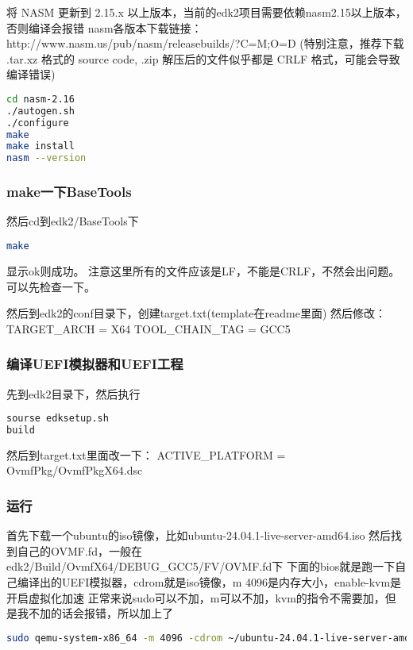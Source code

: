 将 NASM 更新到 2.15.x 以上版本，当前的edk2项目需要依赖nasm2.15以上版本，否则编译会报错
nasm各版本下载链接：http://www.nasm.us/pub/nasm/releasebuilds/?C=M;O=D
(特别注意，推荐下载 .tar.xz 格式的 source code, .zip 解压后的文件似乎都是 CRLF 格式，可能会导致编译错误)

\begin{lstlisting}[language=bash]
cd nasm-2.16
./autogen.sh
./configure
make
make install
nasm --version
\end{lstlisting}

\subsubsection{make一下BaseTools}

然后cd到edk2/BaseTools下
\begin{lstlisting}[language=bash]
make
\end{lstlisting}

显示ok则成功。
注意这里所有的文件应该是LF，不能是CRLF，不然会出问题。可以先检查一下。

然后到edk2的conf目录下，创建target.txt(template在readme里面)
然后修改：
TARGET\_ARCH           = X64
TOOL\_CHAIN\_TAG        = GCC5

\subsubsection{编译UEFI模拟器和UEFI工程}
先到edk2目录下，然后执行
\begin{lstlisting}[language=bash]
sourse edksetup.sh
build
\end{lstlisting}

然后到target.txt里面改一下：
ACTIVE\_PLATFORM       = OvmfPkg/OvmfPkgX64.dsc

\subsubsection{运行}
首先下载一个ubuntu的iso镜像，比如ubuntu-24.04.1-live-server-amd64.iso
然后找到自己的OVMF.fd，一般在edk2/Build/OvmfX64/DEBUG\_GCC5/FV/OVMF.fd下
下面的bios就是跑一下自己编译出的UEFI模拟器，cdrom就是iso镜像，m 4096是内存大小，enable-kvm是开启虚拟化加速
正常来说sudo可以不加，m可以不加，kvm的指令不需要加，但是我不加的话会报错，所以加上了
\begin{lstlisting}[language=bash]
sudo qemu-system-x86_64 -m 4096 -cdrom ~/ubuntu-24.04.1-live-server-amd64.iso -bios ~/OVMF.fd -enable-kvm
\end{lstlisting}

